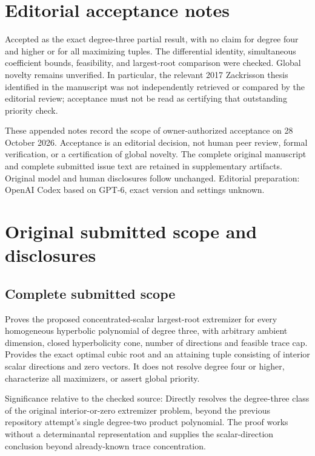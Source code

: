 \documentclass[11pt]{article}
\begin{document}
\section{Editorial acceptance notes}

Accepted as the exact degree-three partial result, with no claim for degree four and higher or for all maximizing tuples. The differential identity, simultaneous coefficient bounds, feasibility, and largest-root comparison were checked. Global novelty remains unverified. In particular, the relevant 2017 Zackrisson thesis identified in the manuscript was not independently retrieved or compared by the editorial review; acceptance must not be read as certifying that outstanding priority check.

These appended notes record the scope of owner-authorized acceptance on 28 October 2026. Acceptance is an editorial decision, not human peer review, formal verification, or a certification of global novelty. The complete original manuscript and complete submitted issue text are retained in supplementary artifacts. Original model and human disclosures follow unchanged. Editorial preparation: OpenAI Codex based on GPT-6, exact version and settings unknown.

\section{Original submitted scope and disclosures}

\subsection{Complete submitted scope}

Proves the proposed concentrated-scalar largest-root extremizer for every homogeneous hyperbolic polynomial of degree three, with arbitrary ambient dimension, closed hyperbolicity cone, number of directions and feasible trace cap. Provides the exact optimal cubic root and an attaining tuple consisting of interior scalar directions and zero vectors. It does not resolve degree four or higher, characterize all maximizers, or assert global priority.

Significance relative to the checked source: Directly resolves the degree-three class of the original interior-or-zero extremizer problem, beyond the previous repository attempt's single degree-two product polynomial. The proof works without a determinantal representation and supplies the scalar-direction conclusion beyond already-known trace concentration.
\end{document}
